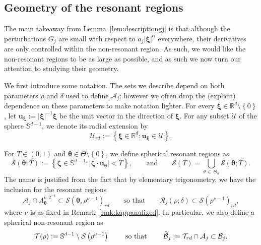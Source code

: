 \documentclass[AHL,Unicode,longabstracts,published]{cedram}
\newcommand{\R}{\mathbb R}
\newcommand{\BBS}{\mathbb S}
\newcommand{\CA}{\mathcal{A}}
\newcommand{\CB}{\mathcal{B}}
\newcommand{\CR}{\mathcal{R}}
\newcommand{\CS}{\mathcal{S}}
\newcommand{\CT}{\mathcal{T}}
\newcommand{\CU}{\mathcal{U}}
\newcommand{\btheta}{\boldsymbol \theta}
\newcommand{\bzeta}{\boldsymbol \zeta}
\newcommand{\bxi}{\boldsymbol \xi}
\newcommand{\bu}{\mathbf u}
\newcommand{\abs}[1]{\left\lvert #1 \right\rvert}
\newcommand{\set}[1]{\left\{ #1 \right\}}
\let\oldtilde\tilde
\renewcommand*{\tilde}[1]{\mathchoice{\widetilde{#1}}{\widetilde{#1}}{\oldtilde{#1}}{\oldtilde{#1}}}
\begin{document}
\subsection{Geometry of the resonant regions}

The main takeaway from Lemma~\ref{lem:descriptiongj} is that although the perturbations $G_j$ are small with respect to $a_j \abs \bxi^\alpha$ everywhere, their derivatives are only controlled within the non-resonant region. As such, we would like the non-resonant regions to be as large as possible, and as such we now turn our attention to studying their geometry.

We first introduce some notation. The sets we describe depend on both parameters $\rho$ and $\delta$ used to define $\CA_j$; however we often drop the (explicit) dependence on these parameters to make notation lighter. For every $\bxi \in \R^d \setminus \set 0$, let $\bu_{\bxi} := \abs \bxi^{-1}\bxi$ be the unit vector in the direction of $\bxi$. For any subset $\CU$ of the sphere $\BBS^{d-1}$, we denote its radial extension by
\[
\CU_{rd} := \set{\bxi \in \R^d : \bu_{\bxi} \in \CU}.
\]


For $T \in (0,1)$ and $\btheta \in
\Theta \setminus \set 0$, we define spherical resonant regions as
\begin{equation}
\CS(\btheta;T) := \set{\bzeta \in \BBS^{d-1} : \abs{\bzeta \cdot \bu_{\btheta}} < T}, \qquad \text{and} \qquad \CS(T) = \bigcup_{\theta\,\in\,\Theta_\kappa} \CS(\btheta;T).
\end{equation}
The name is justified from the fact that by elementary trigonometry, we have the inclusion for the resonant regions
\begin{equation}\label{eq:crjsub}
\CA_j \cap \Lambda^{\nu,2^{-4}}_{\btheta} \subset \CS\left(\btheta,\rho^{\nu - 1}\right)_{rd} \qquad
\text{so that} \qquad
\CR_j(\rho;\delta) \subset \CS\left(\rho^{\nu - 1}\right)_{rd},
\end{equation}
where $\nu$ is as fixed in Remark~\ref{rmk:kappanufixed}. In particular, we also define a spherical non-resonant region as
\begin{equation}
\CT(\rho) := \BBS^{d-1} \setminus \CS\left(\rho^{\nu - 1}\right)\qquad \text{ so that } \qquad
\tilde \CB_j := \CT_{rd} \cap \CA_j \subset \CB_j.
\end{equation}
\end{document}
